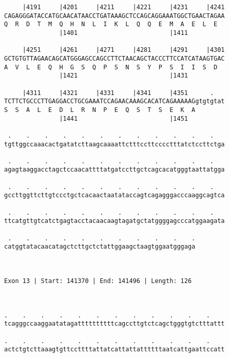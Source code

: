 \documentclass{article}
\begin{document}
\begin{Verbatim}
     |4191     |4201     |4211     |4221     |4231     |4241
CAGAGGGATACCATGCAACATAACCTGATAAAGCTCCAGCAGGAAATGGCTGAACTAGAA
Q  R  D  T  M  Q  H  N  L  I  K  L  Q  Q  E  M  A  E  L  E  
               |1401                         |1411          
  
     |4251     |4261     |4271     |4281     |4291     |4301
GCTGTGTTAGAACAGCATGGGAGCCAGCCTTCTAACAGCTACCCTTCCATCATAAGTGAC
A  V  L  E  Q  H  G  S  Q  P  S  N  S  Y  P  S  I  I  S  D  
               |1421                         |1431          
  
     |4311     |4321     |4331     |4341     |4351      .   
TCTTCTGCCCTTGAGGACCTGCGAAATCCAGAACAAAGCACATCAGAAAAAGgtgtgtat
S  S  A  L  E  D  L  R  N  P  E  Q  S  T  S  E  K  A        
               |1441                         |1451          
  
 .    .    .    .    .    .    .    .    .    .    .    .   
tgttggccaaacactgatatcttaagcaaaattctttccttcccctttatctccttctga
                                                            
 .    .    .    .    .    .    .    .    .    .    .    .   
agagtaaggacctagctccaacattttatgatccttgctcagcacatgggtaattatgga
                                                            
 .    .    .    .    .    .    .    .    .    .    .    .   
gccttggttcttgtccctgctcacaactaatataccagtcagagggacccaaggcagtca
                                                            
 .    .    .    .    .    .    .    .    .    .    .    .   
ttcatgttgtcatctgagtacctacaacaagtagatgctatggggagcccatggaagata
                                                            
 .    .    .    .    .    .    .    .    .    .    .
catggtatacaacatagctcttgctctattggaagctaagtggaatgggaga
                                                    
                                                    
 
Exon 13 | Start: 141370 | End: 141496 | Length: 126



.    .    .    .    .    .    .    .    .    .    .    .    
tcagggccaaggaatatagattttttttttcagccttgtctcagctgggtgtctttattt
                                                            
.    .    .    .    .    .    .    .    .    .    .    .    
actctgtcttaaagtgttccttttattatcattattattttttaatcattgaattccatt
                                                            

\end{Verbatim}
\end{document}
